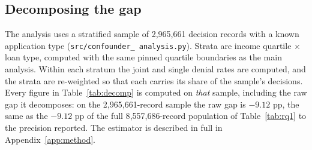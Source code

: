 \documentclass[sigconf,balance=false]{acmart}
\begin{document}
\subsection{Decomposing the gap}\label{sec:confounding}

The analysis uses a stratified sample of 2{,}965{,}661 decision records
with a known application type (\texttt{src/confounder\_\allowbreak
analysis.py}). Strata are income quartile $\times$ loan type, computed with
the same pinned quartile boundaries as the main analysis. Within each
stratum the joint and single denial rates are computed, and the strata are
re-weighted so that each carries its share of the sample's decisions.
Every figure in Table~\ref{tab:decomp} is computed on \emph{that} sample,
including the raw gap it decomposes: on the 2{,}965{,}661-record sample the
raw gap is $-9.12$ pp, the same as the $-9.12$ pp of the full
8{,}557{,}686-record population of Table~\ref{tab:rq1} to the precision
reported. The estimator is described in full in Appendix~\ref{app:method}.
\end{document}
